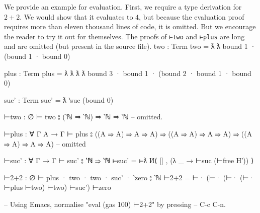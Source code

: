 \documentclass[logo,bsc,singlespacing,parskip,online]{infthesis}
\renewenvironment{code}{\mintedcopy[breaklines,breaksymbolleft=\;]{agda}}{\endmintedcopy}
\begin{document}
We provide an example for evaluation. First, we require a type derivation for $2+2$. We would show
that it evaluates to $4$, but because the evaluation proof requires more than eleven thousand lines
of code, it is omitted. But we encourage the reader to try it out for themselves. The proofs of
\texttt{⊢two} and \texttt{⊢plus} are long and are omitted (but present in the source file).
\begin{code}
  two : Term
  two = ƛ ƛ bound 1 · (bound 1 · bound 0)

  plus : Term
  plus = ƛ ƛ ƛ ƛ bound 3 · bound 1 · (bound 2 · bound 1 · bound 0)

  suc' : Term
  suc' = ƛ ‵suc (bound 0)

  ⊢two : ∅ ⊢ two ⦂ (‵ℕ ⇒ ‵ℕ) ⇒ ‵ℕ ⇒ ‵ℕ
  -- omitted.

  ⊢plus : ∀ {Γ A} → Γ ⊢ plus ⦂
    ((A ⇒ A) ⇒ A ⇒ A) ⇒ ((A ⇒ A) ⇒ A ⇒ A) ⇒ ((A ⇒ A) ⇒ A ⇒ A)
  -- omitted

  ⊢suc' : ∀ {Γ} → Γ ⊢ suc' ⦂ ‵ℕ ⇒ ‵ℕ
  ⊢suc' = ⊢ƛ И⟨ [] , (λ _ → ⊢suc (⊢free H′)) ⟩

  ⊢2+2 : ∅ ⊢ plus · two · two · suc' · ‵zero ⦂ ‵ℕ
  ⊢2+2 = ⊢· (⊢· (⊢· (⊢· ⊢plus  ⊢two) ⊢two) ⊢suc') ⊢zero

  -- Using Emacs, normalise "eval (gas 100) ⊢2+2" by pressing
  -- C-c C-n.
\end{code}
\begin{comment}
\begin{code}
  ⊢two = ⊢ƛ
    И⟨ []
    , (λ a → ⊢ƛ
      И⟨ (a ∷ [])
      , (λ b {b∉} →
        ⊢·
        (⊢free (T (sym-≢ (∉∷[]⇒≢ b∉)) H′))
        (⊢· (⊢free (T (sym-≢ (∉∷[]⇒≢ b∉)) H′)) (⊢free (H′)))) ⟩) ⟩

  ⊢plus = ⊢ƛ
    И⟨ []
    , (λ a → ⊢ƛ
      И⟨ a ∷ []
      , (λ b {b∉} → ⊢ƛ
        И⟨ a ∷ b ∷ []
        , (λ c {c∉} → ⊢ƛ
          И⟨ a ∷ b ∷ c ∷ []
          , (λ d {d∉} →
          ⊢·
            (⊢·
              (⊢free (T (a≢d d∉) (T (a≢c c∉) (T (a≢b b∉) H′))))
              (⊢free (T (c≢d d∉) (H′))))
            (⊢·
              (⊢·
                (⊢free (T (b≢d d∉) (T (b≢c c∉) H′)))
                (⊢free (T (c≢d d∉) H′)))
              (⊢free H′))) ⟩) ⟩) ⟩) ⟩
    where
      a≢d : ∀ {a b c d} → d ∉ a ∷ b ∷ c ∷ [] → a ≢ d
      a≢d d∉ = sym-≢ (∉∷[]⇒≢ (proj₁ (∉-++ d∉)))
      a≢c : ∀ {a b c} → c ∉ a ∷ b ∷ [] → a ≢ c
      a≢c c∉ = sym-≢ (∉∷[]⇒≢ (proj₁ (∉-++ c∉)))
      a≢b : ∀ {a b} → b ∉ a ∷ [] → a ≢ b
      a≢b b∉ = sym-≢ (∉∷[]⇒≢ b∉)
      c≢d : ∀ {a b c d} → d ∉ a ∷ b ∷ c ∷ [] → c ≢ d
      c≢d {a} {b} d∉ =
        sym-≢ (∉∷[]⇒≢ (proj₂ (∉-++ {xs = a ∷ b ∷ []} d∉)))
      b≢d : ∀ {a b c d} → d ∉ a ∷ b ∷ c ∷ [] → b ≢ d
      b≢d {a} {b} d∉ =
        sym-≢ (∉∷[]⇒≢ (proj₂ (
          ∉-++
            {xs = a ∷ []}
            (proj₁ (∉-++ {xs = a ∷ b ∷ []} d∉)))))
      b≢c : ∀ {a b c} → c ∉ a ∷ b ∷ [] → b ≢ c
      b≢c {a} c∉ = sym-≢ (∉∷[]⇒≢ (proj₂ (∉-++ {xs = a ∷ []} c∉)))
\end{code}
\end{comment}
\end{document}
